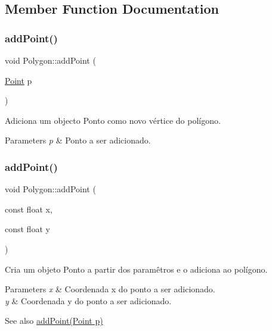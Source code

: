 \subsection{Member Function Documentation}
\mbox{\label{class_polygon_aa7b6a280681bf36afc977f4bd3bcc8d3}} 
\subsubsection{\texorpdfstring{add\+Point()}{addPoint()}\hspace{0.1cm}{\footnotesize\ttfamily [1/2]}}
{\footnotesize\ttfamily void Polygon\+::add\+Point (\begin{DoxyParamCaption}\item[{\hyperlink{class_point}{Point}}]{p }\end{DoxyParamCaption})}



Adiciona um objecto Ponto como novo vértice do polígono. 


\begin{DoxyParams}{Parameters}
{\em p} & Ponto a ser adicionado. \\
\hline
\end{DoxyParams}
\mbox{\label{class_polygon_a639bed3c0635559f7db23f4fa4e54d89}} 
\subsubsection{\texorpdfstring{add\+Point()}{addPoint()}\hspace{0.1cm}{\footnotesize\ttfamily [2/2]}}
{\footnotesize\ttfamily void Polygon\+::add\+Point (\begin{DoxyParamCaption}\item[{const float}]{x,  }\item[{const float}]{y }\end{DoxyParamCaption})}

Cria um objeto Ponto a partir dos paramêtros e o adiciona ao polígono. 
\begin{DoxyParams}{Parameters}
{\em x} & Coordenada x do ponto a ser adicionado. \\
\hline
{\em y} & Coordenada y do ponto a ser adicionado. \\
\hline
\end{DoxyParams}
\begin{DoxySeeAlso}{See also}
\hyperlink{class_polygon_aa7b6a280681bf36afc977f4bd3bcc8d3}{add\+Point(\+Point p)} 
\end{DoxySeeAlso}
\mbox{\label{class_polygon_aaf8aa88f54ac596898c20261f40f77f0}} 
